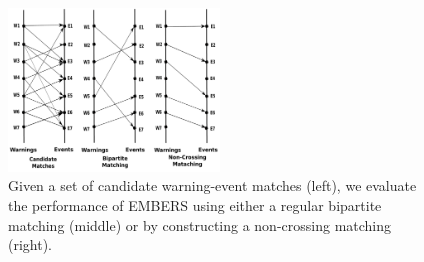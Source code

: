 \begin{figure}[t]
\centering
\includegraphics[width=0.50\textwidth]{figures/matching.pdf}
\caption[An example of the bipartite matching used for evaluation]{Given a set of candidate warning-event matches (left), we evaluate the
performance of EMBERS using either a regular bipartite matching (middle) or
by constructing a non-crossing matching (right).}
\label{fig:matching}
\end{figure}

